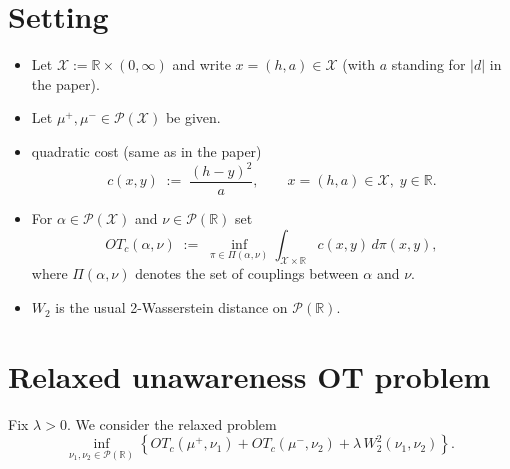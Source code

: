 \documentclass[11pt]{article}
\begin{document}
\section{Setting}
\begin{itemize}
  \item Let $\mathcal X := \mathbb R \times (0,\infty)$ and write $x=(h,a)\in\mathcal X$
  (with $a$ standing for $|d|$ in the paper).
  \item Let $\mu^+,\mu^-\in\mathcal P(\mathcal X)$ be given.
  \item quadratic cost (same as in the paper)
  \begin{equation*}
  c(x,y) \;:=\; \frac{(h-y)^2}{a},\qquad x=(h,a)\in\mathcal X,\; y\in\mathbb R.
\end{equation*}
  \item For $\alpha\in\mathcal P(\mathcal X)$ and $\nu\in\mathcal P(\mathbb R)$ set
  \begin{equation*}
  OT_c(\alpha,\nu) \;:=\; \inf_{\pi\in\Pi(\alpha,\nu)} \int_{\mathcal X\times\mathbb R} c(x,y)\,d\pi(x,y),
\end{equation*}
  where $\Pi(\alpha,\nu)$ denotes the set of couplings between $\alpha$ and $\nu$.
  \item $W_2$ is the usual 2-Wasserstein distance on $\mathcal P(\mathbb R)$.
\end{itemize}

\medskip

\section{Relaxed unawareness OT problem}

Fix $\lambda>0$. We consider the relaxed problem
\begin{equation}\label{eq:P-lambda}
\inf_{\nu_1,\nu_2\in\mathcal P(\mathbb R)}
\left\{
OT_c(\mu^+,\nu_1)+OT_c(\mu^-,\nu_2)
+\lambda\,W_2^2(\nu_1,\nu_2)
\right\}.
\tag{$P_\lambda$}
\end{equation}
\end{document}
